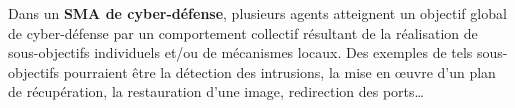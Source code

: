 






Dans un \textbf{SMA de cyber-défense}, plusieurs agents atteignent un objectif global de cyber-défense par un comportement collectif résultant de la réalisation de sous-objectifs individuels et/ou de mécanismes locaux\cite{jamont2015meeting}. Des exemples de tels sous-objectifs pourraient être la détection des intrusions, la mise en œuvre d'un plan de récupération, la restauration d'une image, redirection des ports\dots

